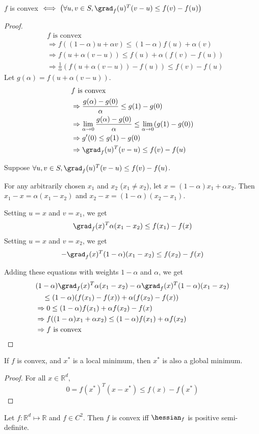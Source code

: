 \begin{theorem}
$f$ is convex $\iff \left( \forall u, v \in S, \grad_f(u)^T(v-u) \le f(v) - f(u) \right)$
\end{theorem}
\begin{proof}
\begin{align*}
& f \textrm{ is convex}
\\ &\Rightarrow f((1-\alpha)u + \alpha v) \le (1-\alpha)f(u) + \alpha(v)
\\ &\Rightarrow f(u + \alpha(v-u)) \le f(u) + \alpha(f(v) - f(u))
\\ &\Rightarrow \frac{1}{\alpha}(f(u + \alpha(v-u)) - f(u)) \le f(v) - f(u)
\end{align*}
Let $g(\alpha) = f(u + \alpha(v-u))$.
\begin{align*}
& f \textrm{ is convex}
\\ &\Rightarrow \frac{g(\alpha) - g(0)}{\alpha} \le g(1) - g(0)
\\ &\Rightarrow \lim_{\alpha \rightarrow 0} \frac{g(\alpha) - g(0)}{\alpha}
    \le \lim_{\alpha \rightarrow 0} (g(1) - g(0))
\\ &\Rightarrow g'(0) \le g(1) - g(0)
\\ &\Rightarrow \grad_f(u)^T(v-u) \le f(v) - f(u)
\end{align*}

Suppose $\forall u, v \in S, \grad_f(u)^T(v-u) \le f(v) - f(u)$.

For any arbitrarily chosen $x_1$ and $x_2$ ($x_1 \neq x_2$), let $x = (1-\alpha)x_1 + \alpha x_2$.
Then $x_1 - x = \alpha(x_1 - x_2)$ and $x_2 - x = (1 - \alpha)(x_2 - x_1)$.

Setting $u = x$ and $v = x_1$, we get
\[ \grad_f(x)^T \alpha(x_1 - x_2) \le f(x_1) - f(x) \]
Setting $u = x$ and $v = x_2$, we get
\[ -\grad_f(x)^T (1-\alpha)(x_1 - x_2) \le f(x_2) - f(x) \]

Adding these equations with weights $1-\alpha$ and $\alpha$, we get
\begin{align*}
& (1-\alpha)\grad_f(x)^T \alpha(x_1 - x_2) - \alpha\grad_f(x)^T (1-\alpha)(x_1 - x_2)
\\ & \quad \le (1-\alpha)(f(x_1) - f(x)) + \alpha(f(x_2) - f(x))
\\ &\Rightarrow 0 \le (1-\alpha)f(x_1) + \alpha f(x_2) - f(x)
\\ &\Rightarrow f((1-\alpha)x_1 + \alpha x_2) \le (1-\alpha)f(x_1) + \alpha f(x_2)
\\ &\Rightarrow f \textrm{ is convex}
\end{align*}
\end{proof}

\begin{theorem}
If $f$ is convex, and $x^*$ is a local minimum, then $x^*$ is also a global minimum.
\end{theorem}
\begin{proof} For all $x \in \mathbb{R}^d$,
\[ 0 = f(x^*)^T(x - x^*) \le f(x) - f(x^*) \]
\end{proof}

\begin{theorem}
Let $f: \mathbb{R}^d \mapsto \mathbb{R}$ and $f \in C^2$.
Then $f$ is convex iff $\hessian_f$ is positive semi-definite.
\end{theorem}


